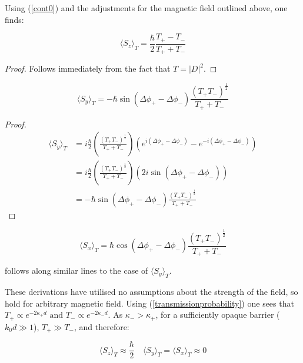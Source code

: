 \documentclass{article}
\begin{document}
\noindent Using (\ref{cont0}) and the adjustments for the magnetic field outlined above, one finds:

\begin{equation}
	\langle S_z \rangle_T = \frac{\hbar}{2}\frac{T_+-T_-}{T_++T_-}
	\label{szT}
\end{equation}


\begin{proof}
Follows immediately from the fact that $T=|D|^2$.
\end{proof}

\begin{equation}
	\langle S_y \rangle_T = -\hbar \sin{(\Delta\phi_+-\Delta\phi_-)}\frac{(T_+T_-)^{\frac{1}{2}}}{T_++T_-}
	\label{syT}
\end{equation}

\begin{proof}
\begin{align}
	\langle S_y \rangle_T &= i\frac{\hbar}{2}\left(\frac{(T_+T_-)^{\frac{1}{2}}}{T_++T_-}\right)\left(e^{i(\Delta\phi_+-\Delta\phi_-)}-e^{-i(\Delta\phi_+-\Delta\phi_-)}\right) \\
			    &= i\frac{\hbar}{2}\left(\frac{(T_+T_-)^{\frac{1}{2}}}{T_++T_-}\right)(2i\sin{(\Delta\phi_+-\Delta\phi_-)}) \\
			    &=-\hbar \sin{(\Delta\phi_+-\Delta\phi_-)}\frac{(T_+T_-)^{\frac{1}{2}}}{T_++T_-}
\end{align}
\end{proof}

\begin{equation}
	\langle S_x \rangle_T = \hbar \cos{(\Delta\phi_+-\Delta\phi_-)}\frac{(T_+T_-)^{\frac{1}{2}}}{T_++T_-}
	\label{sxT}
\end{equation}

\noindent follows along similar lines to the case of $\langle S_y \rangle_T$.

\noindent These derivations have utilised no assumptions about the strength of the field, so hold for arbitrary magnetic field. Using (\ref{transmissionprobability}) one sees that $T_+ \propto e^{-2\kappa_+d} \text{ and } T_- \propto e^{-2\kappa_-d}$. As $\kappa_- > \kappa_+$, for a sufficiently opaque barrier ($k_0d \gg 1$), $T_+ \gg T_-$, and therefore:

\begin{equation}
	\langle S_z \rangle_T \approx \frac{\hbar}{2} \quad \langle S_y \rangle_T = \langle S_x \rangle_T \approx 0
\end{equation}
\end{document}
